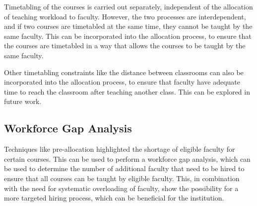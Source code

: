 Timetabling of the courses is carried out separately, independent of the allocation of teaching workload to faculty. However, the two processes are interdependent, and if two courses are timetabled at the same time, they cannot be taught by the same faculty. This can be incorporated into the allocation process, to ensure that the courses are timetabled in a way that allows the courses to be taught by the same faculty.

Other timetabling constraints like the distance between classrooms can also be incorporated into the allocation process, to ensure that faculty have adequate time to reach the classroom after teaching another class. This can be explored in future work.

\subsection{Workforce Gap Analysis}

Techniques like pre-allocation highlighted the shortage of eligible faculty for certain courses. This can be used to perform a workforce gap analysis, which can be used to determine the number of additional faculty that need to be hired to ensure that all courses can be taught by eligible faculty. This, in combination with the need for systematic overloading of faculty, show the possibility for a more targeted hiring process, which can be beneficial for the institution.
